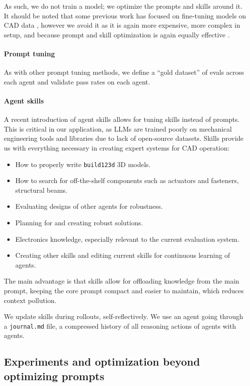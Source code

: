 \documentclass[conference]{IEEEtran}
\begin{document}
As such, we do not train a model; we optimize the prompts and skills around it. It should be noted that some previous work has focused on fine-tuning models on CAD data \cite{ref39}, however we avoid it as it is again more expensive, more complex in setup, and because prompt and skill optimization is again equally effective \cite{ref26}.

\paragraph{Prompt tuning}
As with other prompt tuning methods, we define a ``gold dataset'' of evals across each agent and validate pass rates on each agent.

\paragraph{Agent skills}
A recent introduction of agent skills allows for tuning skills instead of prompts. This is critical in our application, as LLMs are trained poorly on mechanical engineering tools and libraries due to lack of open-source datasets. Skills provide us with everything necessary in creating expert systems for CAD operation:

\begin{itemize}
    \item How to properly write \texttt{build123d} 3D models.
    \item How to search for off-the-shelf components such as actuators and fasteners, structural beams.
    \item Evaluating designs of other agents for robustness.
    \item Planning for and creating robust solutions.
    \item Electronics knowledge, especially relevant to the current evaluation system.
    \item Creating other skills and editing current skills for continuous learning of agents.
\end{itemize}

The main advantage is that skills allow for offloading knowledge from the main prompt, keeping the core prompt compact and easier to maintain, which reduces context pollution.

We update skills during rollouts, self-reflectively. We use an agent going through a \texttt{journal.md} file, a compressed history of all reasoning actions of agents with agents.

\subsection{Experiments and optimization beyond optimizing prompts}
\end{document}
